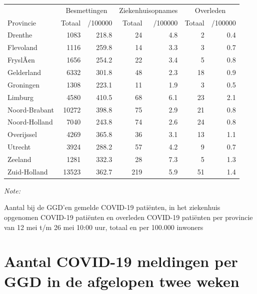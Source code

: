 \documentclass[
  english,
  man,floatsintext]{apa6}
\begin{document}
\begin{table}
\centering
\begin{threeparttable}
\begin{tabular}{lrrrrrr}
\toprule
\multicolumn{1}{c}{ } & \multicolumn{2}{c}{Besmettingen} & \multicolumn{2}{c}{Ziekenhuisopnames} & \multicolumn{2}{c}{Overleden} \\
\cmidrule(l{3pt}r{3pt}){2-3} \cmidrule(l{3pt}r{3pt}){4-5} \cmidrule(l{3pt}r{3pt}){6-7}
Provincie & Totaal & /100000 & Totaal & /100000 & Totaal & /100000\\
\midrule
Drenthe & 1083 & 218.8 & 24 & 4.8 & 2 & 0.4\\
Flevoland & 1116 & 259.8 & 14 & 3.3 & 3 & 0.7\\
FryslÃ¢n & 1656 & 254.2 & 22 & 3.4 & 5 & 0.8\\
Gelderland & 6332 & 301.8 & 48 & 2.3 & 18 & 0.9\\
Groningen & 1308 & 223.1 & 11 & 1.9 & 3 & 0.5\\
Limburg & 4580 & 410.5 & 68 & 6.1 & 23 & 2.1\\
Noord-Brabant & 10272 & 398.8 & 75 & 2.9 & 21 & 0.8\\
Noord-Holland & 7040 & 243.8 & 74 & 2.6 & 24 & 0.8\\
Overijssel & 4269 & 365.8 & 36 & 3.1 & 13 & 1.1\\
Utrecht & 3924 & 288.2 & 57 & 4.2 & 9 & 0.7\\
Zeeland & 1281 & 332.3 & 28 & 7.3 & 5 & 1.3\\
Zuid-Holland & 13523 & 362.7 & 219 & 5.9 & 51 & 1.4\\
\bottomrule
\end{tabular}
\begin{tablenotes}
\item \textit{Note: } 
\item Aantal bij de GGD’en gemelde COVID-19 patiënten, in het ziekenhuis opgenomen COVID-19 patiënten en overleden COVID-19 patiënten per provincie van 12 mei t/m 26 mei 10:00 uur, totaal en per 100.000 inwoners
\end{tablenotes}
\end{threeparttable}
\end{table}

\newpage

\hypertarget{aantal-covid-19-meldingen-per-ggd-in-de-afgelopen-twee-weken}{%
\section{Aantal COVID-19 meldingen per GGD in de afgelopen twee weken}\label{aantal-covid-19-meldingen-per-ggd-in-de-afgelopen-twee-weken}}
\end{document}
